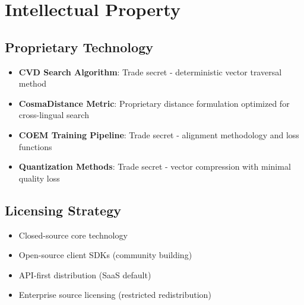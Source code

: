 \section{Intellectual Property}

\subsection{Proprietary Technology}

\begin{itemize}[noitemsep]
    \item \textbf{CVD Search Algorithm}: Trade secret - deterministic vector traversal method
    \item \textbf{CosmaDistance Metric}: Proprietary distance formulation optimized for cross-lingual search
    \item \textbf{COEM Training Pipeline}: Trade secret - alignment methodology and loss functions
    \item \textbf{Quantization Methods}: Trade secret - vector compression with minimal quality loss
\end{itemize}

\subsection{Licensing Strategy}

\begin{itemize}[noitemsep]
    \item Closed-source core technology
    \item Open-source client SDKs (community building)
    \item API-first distribution (SaaS default)
    \item Enterprise source licensing (restricted redistribution)
\end{itemize}
